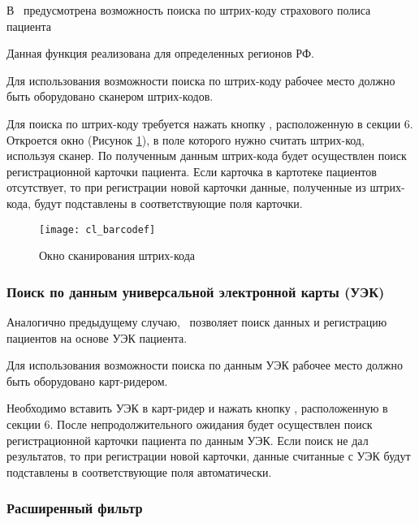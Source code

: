 В \tmis~предусмотрена возможность поиска по штрих-коду страхового полиса пациента 

\begin{prim}
 Данная функция реализована для определенных регионов РФ.
\end{prim}

\begin{vnim}
Для использования возможности поиска по штрих-коду рабочее место должно быть оборудовано сканером штрих-кодов.
\end{vnim}

Для поиска по штрих-коду требуется нажать кнопку  , расположенную в секции 6. Откроется окно (Рисунок \ref{img_cl_barcodef}), в поле которого нужно считать штрих-код, используя сканер. По полученным данным штрих-кода будет осуществлен поиск регистрационной карточки пациента. Если карточка в картотеке пациентов отсутствует, то при регистрации новой карточки данные, полученные из штрих-кода, будут подставлены в соответствующие поля карточки.

\begin{figure}[ht]\centering
 \texttt{[image: cl\_barcodef]}
 \caption{Окно сканирования штрих-кода}
 \label{img_cl_barcodef}
\end{figure} 

\subsubsection {Поиск по данным универсальной электронной карты (УЭК)}

Аналогично предыдущему случаю, \tmis~позволяет поиск данных и регистрацию пациентов на основе УЭК пациента.

\begin{vnim}
 Для использования возможности поиска по данным УЭК рабочее место должно быть оборудовано карт-ридером.
\end{vnim}

Необходимо вставить УЭК в карт-ридер и нажать кнопку  , расположенную в секции 6. После непродолжительного ожидания будет осуществлен поиск регистрационной карточки пациента по данным УЭК. Если поиск не дал результатов, то при регистрации новой карточки, данные считанные с УЭК будут подставлены в соответствующие поля автоматически.

\subsubsection {Расширенный фильтр}

